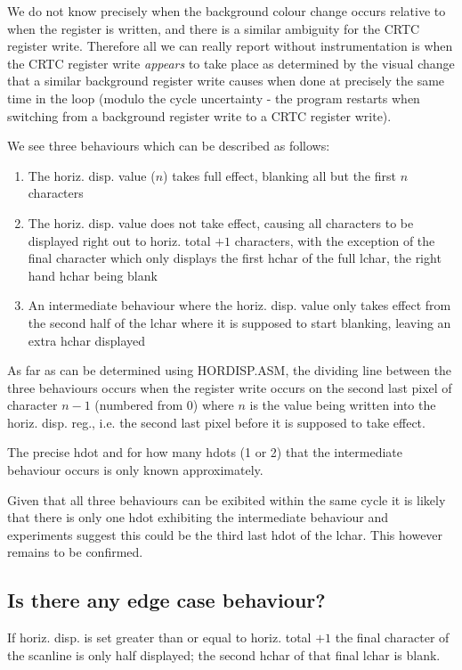 \documentclass[a4paper,10pt]{amsart}
\begin{document}
We do not know precisely when the background colour change occurs relative
to when the register is written, and there is a similar ambiguity for the
CRTC register write. Therefore all we can really report without instrumentation
is when the CRTC register write \emph{appears} to take place as determined by
the visual change that a similar background register write causes when done at
precisely the same time in the loop (modulo the cycle uncertainty - the program
restarts when switching from a background register write to a CRTC register
write).

We see three behaviours which can be described as follows:

\begin{enumerate}
\item The horiz. disp. value ($n$) takes full effect, blanking all but the
first $n$ characters
\item The horiz. disp. value does not take effect, causing all characters
to be displayed right out to horiz. total $+1$ characters, with the exception
of the final character which only displays the first hchar of the full lchar,
the right hand hchar being blank
\item An intermediate behaviour where the horiz. disp. value only takes effect
from the second half of the lchar where it is supposed to start blanking, leaving
an extra hchar displayed
\end{enumerate}

As far as can be determined using HORDISP.ASM, the dividing line between the
three behaviours occurs when the register write occurs on the second last pixel
of character $n - 1$ (numbered from $0$) where $n$ is the value being written
into the horiz. disp. reg., i.e. the second last pixel before it is supposed
to take effect.

The precise hdot and for how many hdots (1 or 2) that the intermediate
behaviour occurs is only known approximately.

Given that all three behaviours can be exibited within the same cycle it is
likely that there is only one hdot exhibiting the intermediate behaviour
and experiments suggest this could be the third last hdot of the lchar. This
however remains to be confirmed.

\subsection{Is there any edge case behaviour?}

If horiz. disp. is set greater than or equal to horiz. total $+1$ the final
character of the scanline is only half displayed; the second hchar of that
final lchar is blank.
\end{document}
